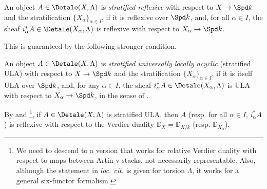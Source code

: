 \documentclass[letterpaper,11pt]{amsart}
\begin{document}
\begin{definition}{\label{defn: stratifiedreflexive}}
    An object $A\in \Detale(X,\Lambda)$ is \emph{stratified reflexive} with respect to $X\to \Spd k$ and the stratification $\{X_\alpha\}_{\alpha\in I}$, if it is reflexive over $\Spd k$, and, for all $\alpha\in I$, the sheaf $i_\alpha^\ast A \in \Detale(X_\alpha,\Lambda)$ is reflexive with respect to $X_\alpha\to \Spd k$.
\end{definition}
This is guaranteed by the following stronger condition.
\begin{definition}\label{defn: StratifiedULA}
    An object $A\in \Detale(X,\Lambda)$ is \emph{stratified universally locally acyclic} (stratified ULA) with respect to $X\to \Spd k$ and the stratification $\{X_\alpha\}_{\alpha\in I}$, if it is itself ULA over $\Spd k$, and, for any $\alpha\in I$, the sheaf $i_\alpha^\ast A \in \Detale(X_\alpha,\Lambda)$ is ULA with respect to $X_\alpha\to \Spd k$, in the sense of \cite[Definition IV.2.31]{FSGeomLLC}.
\end{definition}
\begin{remark}\label{remark: ULAReflexive}
    By \cite[Corollary IV.2.25]{FSGeomLLC} and \cite[Proposition IV.2.15]{FSGeomLLC}\footnote{We need \cite[Proposition IV.2.15]{FSGeomLLC} to descend \cite[Corollary IV.2.25]{FSGeomLLC} to a version that works for relative Verdier duality with respect to maps between Artin v-stacks, not necessarily representable. Also, although the statement in \textit{loc. cit.} is given for torsion $\Lambda$, it works for a general six-functor formalism.}, if $A\in \Detale(X,\Lambda)$ is stratified ULA, then $A$ (resp. for all $\alpha\in I$, $i_\alpha^\ast A$) is reflexive with respect to the Verdier duality $\mathbb{D}_X=\mathbb{D}_{X/k}$ (resp. $\mathbb{D}_{X_\alpha}$).
\end{remark}
\end{document}
